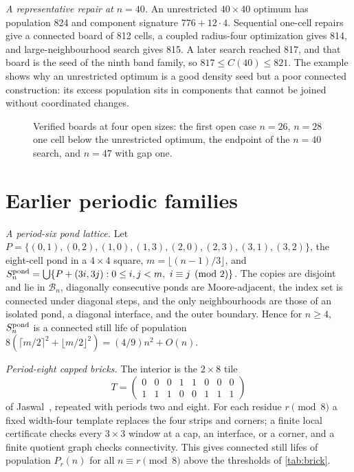 \documentclass[10pt]{article}
\theoremstyle{remark}
\newcommand{\B}{\mathcal B}
\begin{document}
\emph{A representative repair at $n=40$.}  An unrestricted $40\times40$ optimum
has population 824 and component signature $776+12\cdot4$.  Sequential one-cell
repairs give a connected board of 812 cells, a coupled radius-four optimization
gives 814, and large-neighbourhood search gives 815.  A later search reached 817,
and that board is the seed of the ninth band family, so $817\le C(40)\le821$.
The example shows why an unrestricted optimum is a good density seed but a poor
connected construction: its excess population sits in components that cannot be
joined without coordinated changes.

\begin{figure}[h]
\centering

\caption{Verified boards at four open sizes: the first open case $n=26$, $n=28$
one cell below the unrestricted optimum, the endpoint of the $n=40$ search, and
$n=47$ with gap one.}
\label{fig:open-constructions}
\end{figure}

\section{Earlier periodic families}\label{app:families}

\emph{A period-six pond lattice.}  Let
$P=\{(0,1),(0,2),(1,0),(1,3),(2,0),(2,3),(3,1),(3,2)\}$, the eight-cell pond in a
$4\times4$ square, $m=\lfloor(n-1)/3\rfloor$, and
$S_n^{\rm pond}=\bigcup\{P+(3i,3j):0\le i,j<m,\ i\equiv j\pmod2\}$.  The copies are disjoint and lie in $\B_n$, diagonally
consecutive ponds are Moore-adjacent, the index set is connected under diagonal
steps, and the only neighbourhoods are those of an isolated pond, a diagonal
interface, and the outer boundary.  Hence for $n\ge4$, $S_n^{\rm pond}$ is a
connected still life of population
$8(\lceil m/2\rceil^2+\lfloor m/2\rfloor^2)=(4/9)n^2+O(n)$.

\emph{Period-eight capped bricks.}  The interior is the $2\times8$ tile
\[
T=
\begin{pmatrix}
0&0&0&1&1&0&0&0\\
1&1&1&0&0&1&1&1
\end{pmatrix}
\]
of Jaswal~\cite{caisc-jaswal}, repeated with periods two and eight.  For each
residue $r\pmod8$ a fixed width-four template replaces the four strips and
corners; a finite local certificate checks every $3\times3$ window at a cap, an
interface, or a corner, and a finite quotient graph checks connectivity.  This
gives connected still lifes of population $P_r(n)$ for all $n\equiv r\pmod8$
above the thresholds of \cref{tab:brick}.
\end{document}
